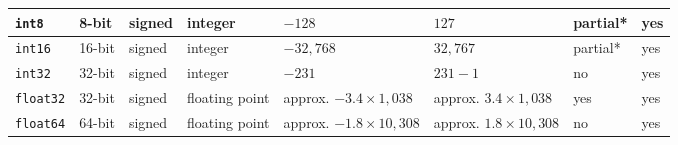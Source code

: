 \documentclass{bmcart}
\begin{document}
\begin{backmatter}
\begin{table}[h!]
\begin{tabular}{| l | l | l | p{0.4in} | p{0.8in} | p{0.8in} | l | l |}
      \texttt{int8}        & 8-bit              & signed              & integer         & $-128$                  & $127$                  & partial*            & yes              \\ \hline
      \texttt{int16}       & 16-bit             & signed              & integer         & $-32,768$               & $32,767$               & partial*            & yes              \\ \hline
      \texttt{int32}       & 32-bit             & signed              & integer         & $-231$                  & $231 - 1$              & no                  & yes              \\ \hline
      \texttt{float32}     & 32-bit             & signed              & floating point  & \parbox[t]{0.8in}{
                                                                                          approx.\\
                                                                                          $-3.4 \times 1,038$
                                                                                          }                       & \parbox[t]{0.8in}{
                                                                                                                    approx.\\
                                                                                                                    $3.4 \times 1,038$
                                                                                                                    }                      & yes                 & yes              \\ \hline
      \texttt{float64}     & 64-bit             & signed              & floating point  & \parbox[t]{0.8in}{
                                                                                          approx.\\
                                                                                          $-1.8 \times 10,308$
                                                                                          }                       & \parbox[t]{0.8in}{
                                                                                                                    approx.\\
                                                                                                                    $1.8 \times 10,308$
                                                                                                                    }                      & no                  & yes              \\ \hline

\end{tabular}
\end{table}
\end{backmatter}
\end{document}
